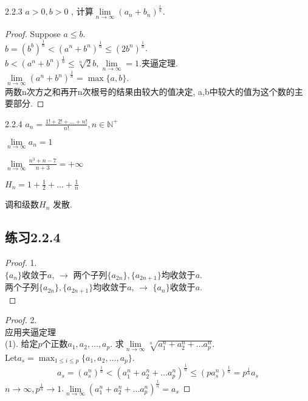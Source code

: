 \begin{example}2.2.3
	$ a>0, b>0$ , 计算$ \lim\limits_{n\rightarrow\infty}(a_n+b_n)^\frac{1}{n} $.
\end{example}
\begin{proof}
	Suppose $ a\leqslant b $.\\
	$ b = (b^b)^{\frac{1}{n}}<(a^n+b^n)^{\frac{1}{n}} \leqslant (2b^n)^{\frac{1}{n}}$.\\
	$ b<(a^n+b^n)^\frac{1}{n}\leqslant\sqrt[n]{2}b, \lim\limits_{n\rightarrow\infty} = 1 $.夹逼定理.\\
	$ \lim\limits_{n\rightarrow\infty}(a^n+b^n)^{\frac{1}{n}} = \max\{a,b\} $.\\
	两数n次方之和再开n次根号的结果由较大的值决定, a,b中较大的值为这个数的主要部分.
\end{proof}

\begin{example}2.2.4
	$ a_n  =\frac{1!+2!+\dots+n!}{n!}, n\in\mathbb{N}^+ $
\end{example}
$ \lim\limits_{n\rightarrow\infty} a_n= 1 $

\begin{example}
	$ \lim\limits_{n\rightarrow\infty}\frac{n^3+n-7}{n+3} = +\infty $
\end{example}

\begin{example}
	$ H_n = 1+\frac{1}{2}+\dots+\frac{1}{n} $
\end{example}
调和级数$ H_n $ 发散.

\subsection{练习2.2.4}

\begin{proof}1.\\
	$ \{a_n \}$收敛于$ a $, $ \rightarrow $ 两个子列$ \{a_{2n}\}, \{a_{2n+1}\} $均收敛于$ a $.\\
	两个子列$ \{a_{2n}\}, \{a_{2n+1}\} $均收敛于$ a $, $ \rightarrow $ $ \{a_n \}$收敛于$ a $.\\
\end{proof}

\begin{proof}2.\\
	应用夹逼定理\\
	(1). 给定$ p $个正数$ a_1, a_2, \dots ,a_p $. 求$ \lim\limits_{n\rightarrow\infty}\sqrt[n]{a_1^n+a_2^n+\dots a_p^n} $.\\
	Let$ a_s = \max_{1\leqslant i \leqslant p}\{a_1,a_2,\dots, a_p\} $.\\
	\begin{equation*}\label{ex2.2.4Ex2}
		a_s = (a_s^n)^\frac{1}{n}
		<
		(a_1^n+a_2^n+\dots a_p^n)^\frac{1}{n}
		\leqslant
		(p a_s^n)^\frac{1}{n}=p^\frac{1}{n}a_s
	\end{equation*}
$ n\rightarrow\infty, p^\frac{1}{n}\rightarrow 1 $.$ \lim\limits_{n\rightarrow\infty}(a_1^n+a_2^n+\dots a_p^n)^\frac{1}{n} = a_s $
\end{proof}
